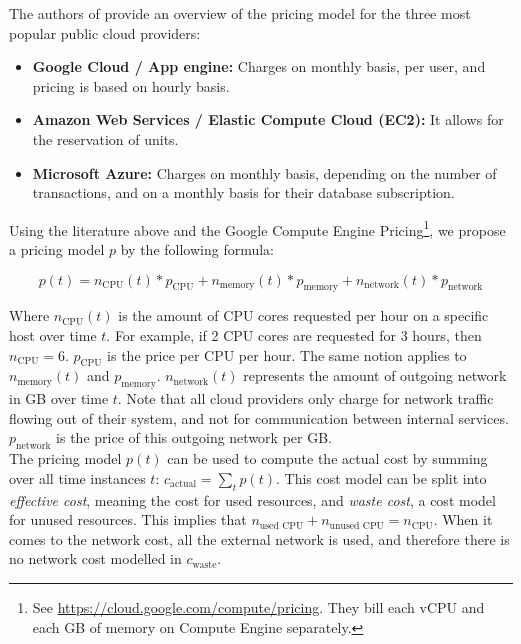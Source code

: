 \noindent
The authors of \cite{mazrekaj2016pricing} provide an overview of the pricing model for the three most popular public cloud providers:
\begin{itemize}
    \item \textbf{Google Cloud / App engine: }Charges on monthly basis, per user, and pricing is based on hourly basis.
    \item \textbf{Amazon Web Services / Elastic Compute Cloud (EC2): }It allows for the reservation of units.
    \item \textbf{Microsoft Azure: }Charges on monthly basis, depending on the number of transactions, and on a monthly basis for their database subscription.
\end{itemize}

Using the literature above and the Google Compute Engine Pricing\footnote{See \url{https://cloud.google.com/compute/pricing}. They bill each vCPU and each GB of memory on Compute Engine separately.}, we propose a pricing model $p$ by the following formula:

\begin{equation} \label{eq:p}
p(t) = n_\text{CPU}(t) * p_\text{CPU} + n_\text{memory}(t) * p_\text{memory} + n_\text{network}(t) * p_\text{network}
\end{equation}

\noindent
Where $n_\text{CPU}(t)$ is the amount of CPU cores requested per hour on a specific host over time $t$. For example, if 2 CPU cores are requested for 3 hours, then $n_\text{CPU} = 6$. $p_\text{CPU}$ is the price per CPU per hour. The same notion applies to $n_\text{memory}(t)$ and $p_\text{memory}$. $n_\text{network}(t)$ represents the amount of outgoing network in GB over time $t$. Note that all cloud providers only charge for network traffic flowing out of their system, and not for communication between internal services. $p_\text{network}$ is the price of this outgoing network per GB.\\

\noindent
The pricing model $p(t)$ can be used to compute the actual cost by summing over all time instances $t$: $c_\text{actual} = \sum_t p(t)$. This cost model can be split into \textit{effective cost}, meaning the cost for used resources, and \textit{waste cost}, a cost model for unused resources. This implies that $n_\text{used CPU} + n_\text{unused CPU} = n_\text{CPU}$. When it comes to the network cost, all the external network is used, and therefore there is no network cost modelled in $c_\text{waste}$. 

